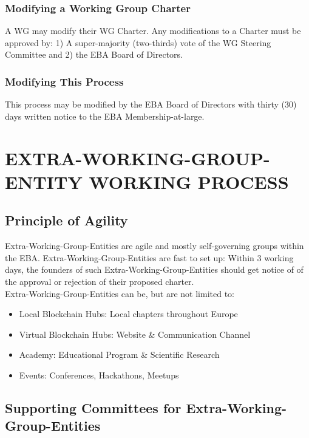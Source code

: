 \documentclass{article}
\begin{document}
\subsubsection{Modifying a Working Group Charter}

A WG may modify their WG Charter. 
Any modifications to a Charter must be approved by: 1) A super-majority (two-thirds) vote of the WG Steering Committee and 2) the EBA Board of Directors.

\subsubsection{Modifying This Process}

This process may be modified by the EBA Board of Directors with thirty (30) days written notice to the EBA Membership-at-large.

\newpage

\section{EXTRA-WORKING-GROUP-ENTITY WORKING PROCESS}

\subsection{Principle of Agility}

Extra-Working-Group-Entities are agile and mostly self-governing groups within the EBA. 
Extra-Working-Group-Entities are fast to set up: Within 3 working days, the founders of such Extra-Working-Group-Entities should get notice of of the approval or rejection of their proposed charter. \\
Extra-Working-Group-Entities can be, but are not limited to: \\

\begin{itemize}
	\item Local Blockchain Hubs: Local chapters throughout Europe
	\item Virtual Blockchain Hubs: Website \& Communication Channel
	\item Academy: Educational Program \& Scientific Research
	\item Events: Conferences, Hackathons, Meetups
\end{itemize}

\subsection{Supporting Committees for Extra-Working-Group-Entities}
\end{document}
